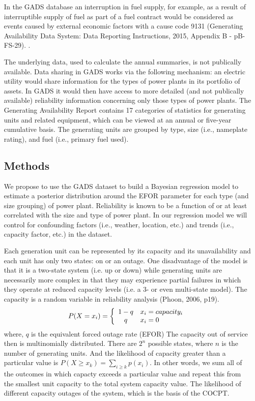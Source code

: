 \documentclass[10pt]{amsart}
\begin{document}
	In the GADS database an interruption in fuel supply, for example, as a result of interruptible supply of fuel as part of a fuel contract would be considered as events caused by external economic factors with a cause code 9131 \parencite{} (Generating Availability Data System: Data Reporting Instructions, 2015, Appendix B - pB-FS-29). . 
	
	The underlying data, used to calculate the annual summaries, is not publically available.
	Data sharing in GADS works via the following mechanism: an electric utility would share information for the types of power plants in its portfolio of assets.
	In GADS it would then have access to more detailed (and not publically available) reliability information concerning only those types of power plants.   
	The Generating Availability Report contains 17 categories of statistics for generating units and related equipment, which can be viewed at an annual or five-year cumulative basis. 
	The generating units are grouped by type, size (i.e., nameplate rating), and fuel (i.e., primary fuel used). 
	 
\subsection{Methods}
	We propose to use the GADS dataset to build a Bayesian regression model to estimate a posterior distribution around the EFOR parameter for each type (and size grouping) of power plant. 
	Reliability is known to be a function of or at least correlated with the size and type of power plant. 
	In our regression model we will control for confounding factors (i.e., weather, location, etc.) and trends (i.e., capacity factor, etc.) in the dataset.  
	
	Each generation unit can be represented by its capacity and its unavailability and each unit has only two states: on or an outage. 
	One disadvantage of the model is that it is a two-state system (i.e. up or down) while generating units are necessarily more complex in that they may experience partial failures in which they operate at reduced capacity levels (i.e. a 3- or even multi-state model).
	The capacity is a random variable in reliability analysis (Phoon, 2006, p19).
	\[
 	   P(X=x_i)=\left\{
             		   \begin{array}{c l}
             			   1-q & x_i = capacity_i \\
             			   q & x_i = 0
            		    \end{array}
         			\right.
	\]
	where, $q$ is the equivalent forced outage rate (EFOR)
	The capacity out of service then is multinomially distributed. 
	There are $2^n$ possible states, where $n$ is the number of generating units.
	And the likelihood of capacity greater than a particular value is $P(X \geq x_k) = \sum_{i \geq k} p(x_i)$.
	In other words, we sum all of the outcomes in which capacty exceeds a particular value and repeat this from the smallest unit capacity to the total system capacity value.  
	The likelihood of different capacity outages of the system, which is the basis of the COCPT. 			
	




\printbibliography
\end{document}
